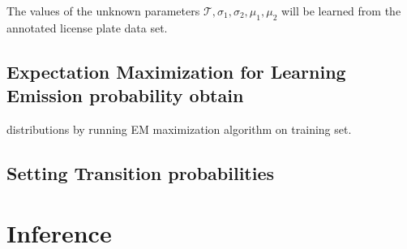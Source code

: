 \documentclass[a4paper,12pt]{article}
\newcounter{ohNoteCounter}
\newcommand{\ohnote}[1]{{\scriptsize  \color{Cgreen} $\clubsuit$~\refstepcounter{ohNoteCounter}\textsf{[OH]$_{\arabic{ohNoteCounter}}$:{#1}}}}
\renewcommand{\ohnote}[1]{}
\begin{document}
The values of the unknown parameters $\mathcal{T}, \sigma_1, \sigma_2,
\mu_1, \mu_2$ will be learned from the annotated license plate data
set.

  \subsection{Expectation Maximization for Learning Emission
    probability obtain}

  
  distributions by running EM maximization algorithm on training set.
 

  

  \ohnote{Describe usage of EM alg.}


  \subsection{Setting Transition probabilities}

  \section{Inference}
\end{document}
